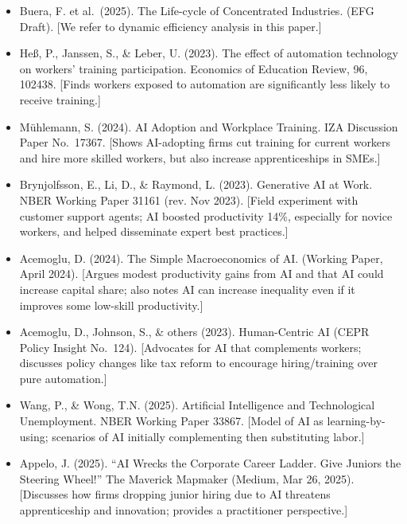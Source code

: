 \documentclass[12pt]{article}
\begin{document}
\begin{itemize}

\item
  Buera, F. et al.~(2025). {The Life-cycle of Concentrated
  Industries}. (EFG Draft). {[}We refer to dynamic efficiency analysis
  in this paper.{]}
\item
  Heß, P., Janssen, S., \& Leber, U. (2023). {The effect of
  automation technology on workers' training participation}.
  {Economics of Education Review, 96}, 102438. {[}Finds workers
  exposed to automation are significantly less likely to receive
  training.{]}
\item
  Mühlemann, S. (2024). {AI Adoption and Workplace Training}. IZA
  Discussion Paper No.~17367. {[}Shows AI-adopting firms cut training
  for current workers and hire more skilled workers, but also increase
  apprenticeships in SMEs.{]}
\item
  Brynjolfsson, E., Li, D., \& Raymond, L. (2023). {Generative AI
  at Work}. NBER Working Paper 31161 (rev. Nov 2023). {[}Field
  experiment with customer support agents; AI boosted productivity 14\%,
  especially for novice workers, and helped disseminate expert best
  practices.{]}
\item
  Acemoglu, D. (2024). {The Simple Macroeconomics of AI}. (Working
  Paper, April 2024). {[}Argues modest productivity gains from AI and
  that AI could increase capital share; also notes AI can increase
  inequality even if it improves some low-skill productivity.{]}
\item
  Acemoglu, D., Johnson, S., \& others (2023). {Human-Centric AI}
  (CEPR Policy Insight No.~124). {[}Advocates for AI that complements
  workers; discusses policy changes like tax reform to encourage
  hiring/training over pure automation.{]}
\item
  Wang, P., \& Wong, T.N. (2025). {Artificial Intelligence and
  Technological Unemployment}. NBER Working Paper 33867. {[}Model of AI
  as learning-by-using; scenarios of AI initially complementing then
  substituting labor.{]}
\item
  Appelo, J. (2025). ``AI Wrecks the Corporate Career Ladder. Give
  Juniors the Steering Wheel!'' {The Maverick Mapmaker} (Medium,
  Mar 26, 2025). {[}Discusses how firms dropping junior hiring due to AI
  threatens apprenticeship and innovation; provides a practitioner
  perspective.{]}
\end{itemize}
\end{document}
